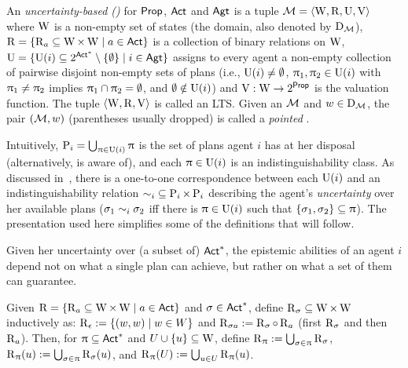 \medskip

\begin{definition}\label{def:ults}
An \emph{uncertainty-based \lts (\ults)} for ${\rm \sf Prop}$, ${\rm \sf Act}$ and ${\rm \sf Agt}$ is a tuple $\mathcal{M} = \langle \operatorname{W},\operatorname{R},\operatorname{U},\operatorname{V} \rangle$ where $\operatorname{W}$ is a non-empty set of states (the domain, also denoted by $\operatorname{D}_{\mathcal{M}}$), $\operatorname{R} = \{ \operatorname{R}_a \subseteq \operatorname{W} \times \operatorname{W} \mid a \in {\rm \sf Act} \}$ is a collection of binary relations on $\operatorname{W}$, $\operatorname{U} = \{ \operatorname{U}(i) \subseteq 2^{{\rm \sf Act}^*}\setminus \{ \emptyset \} \mid i \in {\rm \sf Agt} \}$ assigns to every agent a non-empty collection of pairwise disjoint non-empty sets of plans (i.e., $\operatorname{U}(i) \neq \emptyset$, $\uppi_1, \uppi_2 \in \operatorname{U}(i)$ with $\uppi_1 \neq \uppi_2$ implies $\uppi_1 \cap \uppi_2 = \emptyset$, and $\emptyset \notin \operatorname{U}(i)$) and $\operatorname{V}:\operatorname{W} \to 2^{\rm \sf Prop}$ is the valuation function. The tuple $\langle \operatorname{W},\operatorname{R},\operatorname{V} \rangle$ is called an LTS. Given an \ults $\mathcal{M}$ and $w \in \operatorname{D}_{\mathcal{M}}$, the pair $(\mathcal{M},w)$ (parentheses usually dropped) is called a \emph{pointed \ults}.
\end{definition}
\medskip


Intuitively, $\operatorname{P}_{i} = \bigcup_{\uppi \in \operatorname{U}(i)} \uppi$ is the set of plans agent $i$ has at her disposal (alternatively, is aware of), and each $\uppi \in \operatorname{U}(i)$ is an indistinguishability class. As discussed in~\cite{AFSVQ21}, there is a one-to-one correspondence between each $\operatorname{U}(i)$ and an indistinguishability relation ${\sim_i} \subseteq \operatorname{P}_{i} \times \operatorname{P}_{i}$ describing the agent's \emph{uncertainty} over her available plans ($\sigma_1 \sim_i \sigma_2$ iff there is $\uppi \in \operatorname{U}(i)$ such that $\{ \sigma_1, \sigma_2 \} \subseteq \uppi$). The presentation used here simplifies some of the definitions that will follow.

Given her uncertainty over (a subset of) ${\rm \sf Act}^*$, the epistemic abilities of an agent $i$ depend not on what a single plan can achieve, but rather on what a set of them can guarantee.

\medskip

\begin{definition}
Given $\operatorname{R}=\{ \operatorname{R}_a \subseteq \operatorname{W} \times \operatorname{W} \mid a\in{\rm \sf Act} \}$ and $\sigma \in {\rm \sf Act}^*$, define $\operatorname{R}_\sigma \subseteq \operatorname{W} \times \operatorname{W}$  inductively as: $\operatorname{R}_\epsilon := \{ (w,w) \mid w \in W \}$ and $\operatorname{R}_{{\sigma}a} := \operatorname{R}_\sigma \circ \operatorname{R}_a$ (first $\operatorname{R}_{\sigma}$ and then $\operatorname{R}_a$). Then, for $\uppi \subseteq {\rm \sf Act}^*$ and $U \cup \{u \} \subseteq \operatorname{W}$, define $\operatorname{R}_\uppi := \bigcup_{\sigma \in \uppi} \operatorname{R}_{\sigma}$, $\operatorname{R}_{\uppi}(u) := \bigcup_{\sigma \in \uppi} \operatorname{R}_\sigma(u)$, and $\operatorname{R}_{\uppi}(U) := \bigcup_{u \in U} \operatorname{R}_{\uppi}(u)$.
\end{definition}

